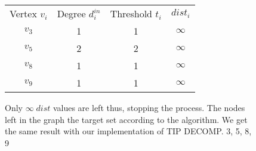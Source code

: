 \begin{figure}
\begin{minipage}{0.45\textwidth}
\end{minipage}
\begin{minipage}{0.45\textwidth}
    \begin{tabular}{c c c c }
		Vertex $v_{i}$ & Degree $d^{in}_{i}$ & Threshold $t_{i}$ & $dist_{i}$\\
		$v_{3}$ & 1 & 1 & $\infty$  \\
		$v_{5}$ & 2 & 2 & $\infty$ \\
		$v_{8}$ & 1 & 1 & $\infty$ \\
		$v_{9}$ &  1 & 1 & $\infty$ \\
	\end{tabular}
\end{minipage}
\noindent\makebox[\linewidth]{\rule{\paperwidth}{0.4pt}}
\vspace*{0.3cm} 

Only $\infty \; dist$ values are left thus, stopping the process. The nodes left in the graph the target set according to the algorithm. We get the same result with our implementation of TIP DECOMP. 3, 5, 8, 9
\end{figure}

